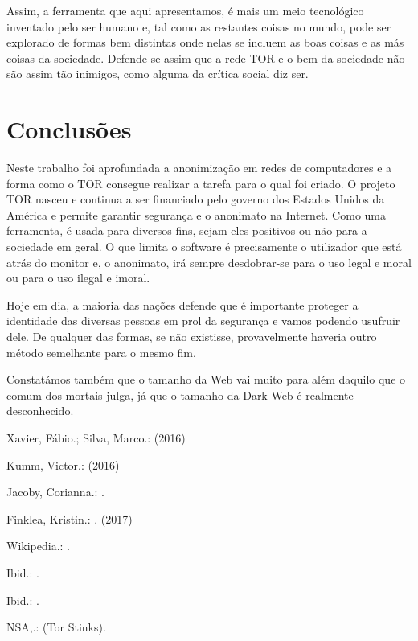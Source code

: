 \documentclass{llncs}
\begin{document}
\par Assim, a ferramenta que aqui apresentamos, é mais um meio tecnológico inventado pelo ser humano e, tal como as restantes coisas no mundo, pode ser explorado de formas bem distintas onde nelas se incluem as boas coisas e as más coisas da sociedade. Defende-se assim que a rede TOR e o bem da sociedade não são assim tão inimigos, como alguma da crítica social diz ser.


\section{Conclusões}
\hspace{3mm} Neste trabalho foi aprofundada a anonimização em redes de computadores e a forma como o TOR consegue realizar a tarefa para o qual foi criado. O projeto TOR nasceu e continua a ser financiado pelo governo dos Estados Unidos da América e permite garantir segurança e o anonimato na Internet. Como uma ferramenta, é usada para diversos fins, sejam eles positivos ou não para a sociedade em geral. O que limita o software é precisamente o utilizador que está atrás do monitor e, o anonimato, irá sempre desdobrar-se para o uso legal e moral ou para o uso ilegal e imoral.
\par Hoje em dia, a maioria das nações defende que é importante proteger a identidade das diversas pessoas em prol da segurança e vamos podendo usufruir dele. De qualquer das formas, se não existisse, provavelmente haveria outro método semelhante para o mesmo fim.
\par Constatámos também que o tamanho da Web vai muito para além daquilo que o comum dos mortais julga, já que o tamanho da Dark Web é realmente desconhecido.

\begin{thebibliography}{1}
Xavier, Fábio.; Silva, Marco.:
 (2016)

Kumm, Victor.:
 (2016)

Jacoby, Corianna.:
.

Finklea, Kristin.:
. (2017)

Wikipedia.:
.

Ibid.:
.

Ibid.:
.

NSA,.:
 (Tor Stinks).

\end{thebibliography}
\end{document}
